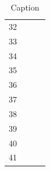 \documentclass[12pt, a4paper]{article}
\begin{document}
\begin{table}[h!]
\begin{tabular}{|c|c|c|c|}
         \footnotesize 32 & & & \\ 
         \footnotesize 33 & & & \\
         \footnotesize 34 & & & \\
         \footnotesize 35 & & & \\
         \footnotesize 36 & & & \\
         \footnotesize 37 & & & \\
         \footnotesize 38 & & & \\
         \footnotesize 39 & & & \\
         \footnotesize 40 & & & \\
         \footnotesize 41 & & & \\
    \hline
         
    \end{tabular}
    \caption{Caption}
    \label{Tabella Completa}
\end{table}
\end{document}
